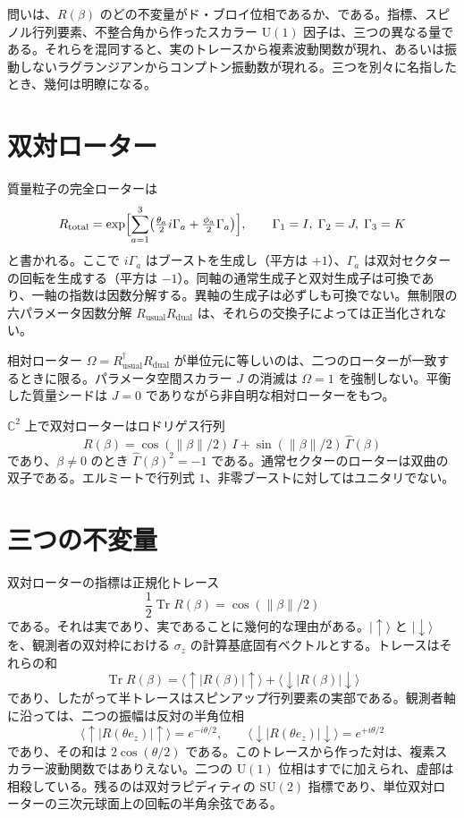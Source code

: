 \documentclass[a4paper]{article}
\begin{document}
問いは、\(R(\beta)\) のどの不変量がド・ブロイ位相であるか、である。指標、スピノル行列要素、不整合角から作ったスカラー \(\mathrm{U}(1)\) 因子は、三つの異なる量である。それらを混同すると、実のトレースから複素波動関数が現れ、あるいは振動しないラグランジアンからコンプトン振動数が現れる。三つを別々に名指したとき、幾何は明瞭になる。

\section{双対ローター}

質量粒子の完全ローターは
\[
R_{\mathrm{total}}
  =\exp\Bigl[\sum_{a=1}^3\bigl(\tfrac{\theta_a}{2}i\Gamma_a+\tfrac{\phi_a}{2}\Gamma_a\bigr)\Bigr],
\qquad \Gamma_1=I,\;\Gamma_2=J,\;\Gamma_3=K
\]
と書かれる。ここで \(i\Gamma_a\) はブーストを生成し（平方は \(+1\)）、\(\Gamma_a\) は双対セクターの回転を生成する（平方は \(-1\)）。同軸の通常生成子と双対生成子は可換であり、一軸の指数は因数分解する。異軸の生成子は必ずしも可換でない。無制限の六パラメータ因数分解 \(R_{\mathrm{usual}}R_{\mathrm{dual}}\) は、それらの交換子によっては正当化されない。

相対ローター \(\Omega=R_{\mathrm{usual}}^{\dagger}R_{\mathrm{dual}}\) が単位元に等しいのは、二つのローターが一致するときに限る。パラメータ空間スカラー \(J\) の消滅は \(\Omega=1\) を強制しない。平衡した質量シードは \(J=0\) でありながら非自明な相対ローターをもつ。

\(\mathbb{C}^2\) 上で双対ローターはロドリゲス行列
\[
R(\beta)=\cos(\lVert\beta\rVert/2)\,I+\sin(\lVert\beta\rVert/2)\,\widehat{\Gamma}(\beta)
\]
であり、\(\beta\neq 0\) のとき \(\widehat{\Gamma}(\beta)^2=-1\) である。通常セクターのローターは双曲の双子である。エルミートで行列式 \(1\)、非零ブーストに対してはユニタリでない。

\section{三つの不変量}

双対ローターの指標は正規化トレース
\[
\frac12\operatorname{Tr} R(\beta)=\cos(\lVert\beta\rVert/2)
\]
である。それは実であり、実であることに幾何的な理由がある。\(\lvert\uparrow\rangle\) と \(\lvert\downarrow\rangle\) を、観測者の双対枠における \(\sigma_z\) の計算基底固有ベクトルとする。トレースはそれらの和
\[
\operatorname{Tr} R(\beta)
  =\langle\uparrow\rvert R(\beta)\lvert\uparrow\rangle
  +\langle\downarrow\rvert R(\beta)\lvert\downarrow\rangle
\]
であり、したがって半トレースはスピンアップ行列要素の実部である。観測者軸に沿っては、二つの振幅は反対の半角位相
\[
\langle\uparrow\rvert R(\theta e_z)\lvert\uparrow\rangle=e^{-i\theta/2},\qquad
\langle\downarrow\rvert R(\theta e_z)\lvert\downarrow\rangle=e^{+i\theta/2}
\]
であり、その和は \(2\cos(\theta/2)\) である。このトレースから作った対は、複素スカラー波動関数ではありえない。二つの \(\mathrm{U}(1)\) 位相はすでに加えられ、虚部は相殺している。残るのは双対ラピディティの \(\mathrm{SU}(2)\) 指標であり、単位双対ローターの三次元球面上の回転の半角余弦である。
\end{document}
